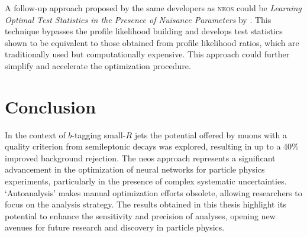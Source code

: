 A follow-up approach proposed by the same developers as \textsc{neos} could be \textit{Learning Optimal Test Statistics in the Presence of Nuisance Parameters} by \citet{heinrich2022learningoptimalteststatistics}. This technique bypasses the profile likelihood building and develops test statistics shown to be equivalent to those obtained from profile likelihood ratios, which are traditionally used but computationally expensive. This approach could further simplify and accelerate the optimization procedure.




\section{Conclusion}
In the context of $b$-tagging small-$R$ jets the potential offered by muons with a quality criterion from semileptonic decays was explored, resulting in up to a 40\% improved background rejection. The \ac{neos} approach represents a significant advancement in the optimization of neural networks for particle physics experiments, particularly in the presence of complex systematic uncertainties. `Autoanalysis' makes manual optimization efforts obsolete, allowing researchers to focus on the analysis strategy. The results obtained in this thesis highlight its potential to enhance the sensitivity and precision of analyses, opening new avenues for future research and discovery in particle physics.






